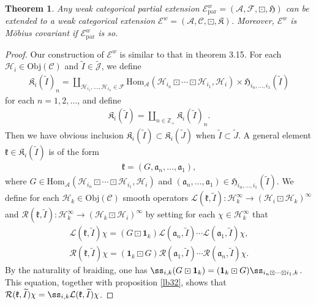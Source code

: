 \documentclass[11pt,b5paper,notitlepage]{article}
\theoremstyle{definition}
\theoremstyle{plain}
\newtheorem{thm}[df]{Theorem}
\newcommand{\fk}{\mathfrak}
\newcommand{\mc}{\mathcal}
\newcommand{\wtd}{\widetilde}
\newcommand{\id}{\mathbf{1}}
\newcommand{\Hom}{\mathrm{Hom}}
\newcommand{\loc}{\mathrm{par}}
\newcommand{\scr}{\mathscr}
\newcommand{\Jtd}{\widetilde{\mathcal J}}
\newcommand{\mbb}{\mathbb}
\newcommand{\Obj}{\mathrm{Obj}}
\numberwithin{equation}{subsection}
\begin{document}
\begin{thm}\label{lb40}
Any weak categorical partial extension $\scr E^w_\loc=(\mc A,\mc F,\boxdot,\fk H)$ can be extended to a weak categorical extension $\scr E^w=(\mc A,\scr C,\boxdot,\fk K)$. Moreover, $\scr E^w$ is M\"obius covariant if $\scr E^w_\loc$ is so.
\end{thm}

\begin{proof}
Our construction of $\scr E^w$ is similar to that in \cite{Gui21a} theorem 3.15. For each $\mc H_i\in\Obj(\scr C)$ and $\wtd I\in\Jtd$, we define
\begin{gather}
\fk K_i(\wtd I)_{n}=\coprod_{\mc H_{i_1},\dots,\mc H_{i_n}\in\mc F}\Hom_{\mc A}(\mc H_{i_n}\boxdot\cdots\boxdot\mc H_{i_1},\mc H_i)\times\fk H_{i_n,\dots,i_1}(\wtd I)
\end{gather}
for each $n=1,2,\dots$, and define
\begin{gather}
\fk K_i(\wtd I)=\coprod_{n\in\mbb Z_+}\fk K_i(\wtd I)_n.
\end{gather}
Then we have obvious inclusion $\fk K_i(\wtd I)\subset\fk K_i(\wtd J)$ when $\wtd I\subset\wtd J$. A general element  $\fk k\in\fk K_i(\wtd I)$ is of the form
\begin{align*}
\fk k=(G,\fk a_n,\dots,\fk a_1),
\end{align*}
where $G\in\Hom_{\mc A}(\mc H_{i_n}\boxdot\cdots\boxdot\mc H_{i_1},\mc H_i)$ and $(\fk a_n,\dots,\fk a_1)\in\fk H_{i_n,\dots,i_1}(\wtd I)$. We define for each $\mc H_k\in\Obj(\scr C)$  smooth operators $\mc L(\fk k,\wtd I):\mc H_k^\infty\rightarrow(\mc H_i\boxdot\mc H_k)^\infty$ and $\mc R(\fk k,\wtd I):\mc H_k^\infty\rightarrow(\mc H_k\boxdot\mc H_i)^\infty$ by setting for each $\chi\in\mc H_k^\infty$ that
\begin{gather}
\mc L(\fk k,\wtd I)\chi=(G\boxdot\id_k)\mc L(\fk a_n,\wtd I)\cdots\mc L(\fk a_1,\wtd I)\chi,\\
\mc R(\fk k,\wtd I)\chi=(\id_k\boxdot G)\mc R(\fk a_1,\wtd I)\cdots\mc R(\fk a_n,\wtd I)\chi.
\end{gather}
By the naturality of braiding, one has $\ss_{i,k}(G\boxdot\id_k)=(\id_k\boxdot G)\ss_{i_n\boxdot\cdots\boxdot i_1,k}$. This equation, together with proposition \ref{lb32}, shows that $\mc R(\fk k,\wtd I)\chi=\ss_{i,k}\mc L(\fk k,\wtd I)\chi$. 


\end{proof}
\end{document}
